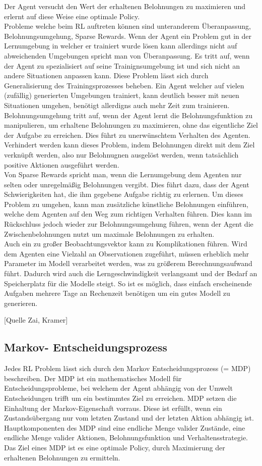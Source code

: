 Der Agent versucht den Wert der erhaltenen Belohnungen zu maximieren und erlernt auf diese Weise eine optimale Policy. \\
Probleme welche beim RL auftreten können sind unteranderem Überanpassung, Belohnungsumgehung, Sparse Rewards.
Wenn der Agent ein Problem gut in der Lernumgebung in welcher er trainiert wurde lösen kann allerdings nicht auf abweichenden Umgebungen spricht man von Überanpassung. Es tritt auf, wenn der Agent zu spezialisiert auf seine Trainignsumgebung ist und sich nicht an andere Situationen anpassen kann. Diese Problem lässt sich durch Generalisierung des Trainingsprozesses beheben. Ein Agent welcher auf vielen (zufällig) generierten Umgebungen trainiert, kann deutlich besser mit neuen Situationen umgehen, benötigt allerdigns auch mehr Zeit zum trainieren. \\
Belohnungsumgehung tritt auf, wenn der Agent lernt die Belohnungsfunktion zu manipulieren, um erhaltene Belohnungen zu maximieren, ohne das eigentliche Ziel der Aufgabe zu erreichen. Dies führt zu unerwünschtem Verhalten des Agenten. Verhindert werden kann dieses Problem, indem Belohnungen direkt mit dem Ziel verknüpft werden, also nur Belohnugnen ausgelöst werden, wenn tatsächlich positive Aktionen ausgeführt werden. \\
Von Sparse Rewards spricht man, wenn die Lernumgebung dem Agenten nur selten oder unregelmäßig Belohnungen vergibt. Dies führt dazu, dass der Agent Schwierigkeiten hat, die ihm gegebene Aufgabe richtig zu erlernen. Um dieses Problem zu umgehen, kann man zusätzliche künstliche Belohnungen einführen, welche dem Agenten auf den Weg zum richtigen Verhalten führen. Dies kann im Rückschluss jedoch wieder zur Belohnungsumgehung führen, wenn der Agent die Zwischenbelohnungen nutzt um maximale Belohnungen zu erhalten. \\
Auch ein zu großer Beobachtungsvektor kann zu Komplikationen führen. Wird dem Agenten eine Vielzahl an Observationen zugeführt, müssen erheblich mehr Parameter im Modell verarbeitet werden, was zu größerem Berechnungsaufwand führt. Dadurch wird auch die Lerngeschwindigkeit verlangsamt und der Bedarf an Speicherplatz für die Modelle steigt. So ist es möglich, dass einfach erscheinende Aufgaben mehrere Tage an Rechenzeit benötigen um ein gutes Modell zu generieren.

[Quelle Zai, Kramer]
\newpage
\subsection{Markov- Entscheidungsprozess}
Jedes RL Problem lässt sich durch den Markov Entscheidungsprozess (= MDP) beschreiben.
Der MDP ist ein mathematisches Modell für Entscheidungsprobleme, bei welchem der Agent abhängig von der Umwelt Entscheidungen trifft um ein bestimmtes Ziel zu erreichen.
MDP setzen die Einhaltung der Markov-Eigenschaft vorraus. Diese ist erfüllt, wenn ein Zustandsübergang nur vom letzten Zustand und der letzten Aktion abhängig ist.
Hauptkomponenten des MDP sind eine endliche Menge valider Zustände, eine endliche Menge valider Aktionen, Belohnungsfunktion und Verhaltensstrategie.
Das Ziel eines MDP ist es eine optimale Policy, durch Maximierung der erhaltenen Belohnungen zu ermitteln.


